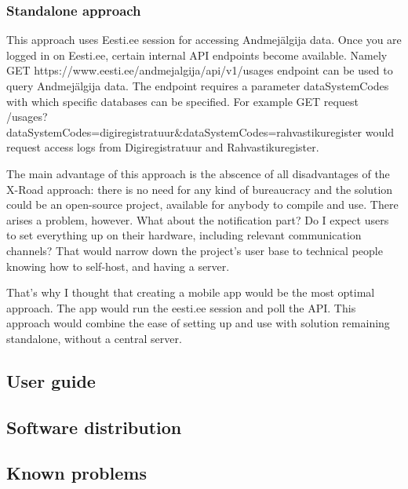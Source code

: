\subsubsection{Standalone approach}
This approach uses Eesti.ee session for accessing Andmejälgija data. Once you are logged in on Eesti.ee, certain internal API endpoints become available. Namely GET https://www.eesti.ee/andmejalgija/api/v1/usages endpoint can be used to query Andmejälgija data. The endpoint requires a parameter dataSystemCodes with which specific databases can be specified. For example GET request /usages?dataSystemCodes=digiregistratuur\&dataSystemCodes=rahvastikuregister would request access logs from Digiregistratuur and Rahvastikuregister.

The main advantage of this approach is the abscence of all disadvantages of the X-Road approach: there is no need for any kind of bureaucracy and the solution could be an open-source project, available for anybody to compile and use. There arises a problem, however. What about the notification part? Do I expect users to set everything up on their hardware, including relevant communication channels? That would narrow down the project's user base to technical people knowing how to self-host, and having a server.

That's why I thought that creating a mobile app would be the most optimal approach. The app would run the eesti.ee session and poll the API. This approach would combine the ease of setting up and use with solution remaining standalone, without a central server.

\subsection{User guide}
\subsection{Software distribution}
\subsection{Known problems}
